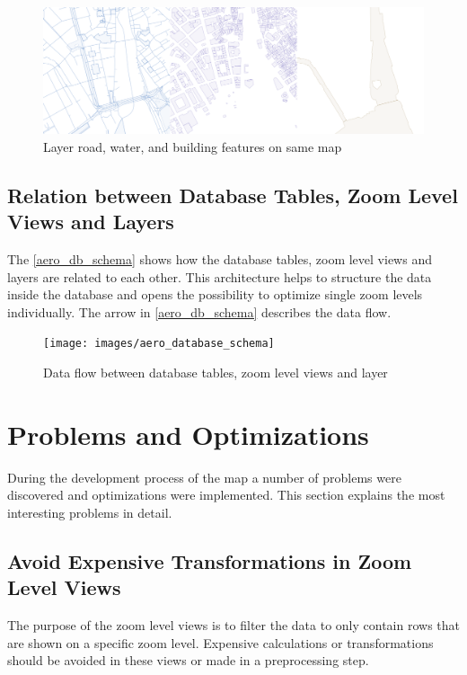 \begin{figure}[H]
\centering
\includegraphics[width=\textwidth]{images/road_water_building}
\caption{Layer road, water, and building features on same map}
\end{figure}

\subsection{Relation between Database Tables, Zoom Level Views and Layers}

The \autoref{aero_db_schema} shows how the database tables, zoom level views and layers are related to each other. This architecture helps to structure the \osm{} data inside the database and opens the possibility to optimize single zoom levels individually. The arrow in \autoref{aero_db_schema} describes the data flow.

\begin{figure}[H]
\centering
\texttt{[image: images/aero\_database\_schema]}
\caption{Data flow between database tables, zoom level views and layer}
\label{aero_db_schema}
\end{figure}

\section{Problems and Optimizations}

During the development process of the map a number of problems were discovered and optimizations were implemented. This section explains the most interesting problems in detail.

\subsection{Avoid Expensive Transformations in Zoom Level Views}

The purpose of the zoom level views is to filter the data to only contain rows that are shown on a specific zoom level. Expensive calculations or transformations should be avoided in these views or made in a preprocessing step.\\

